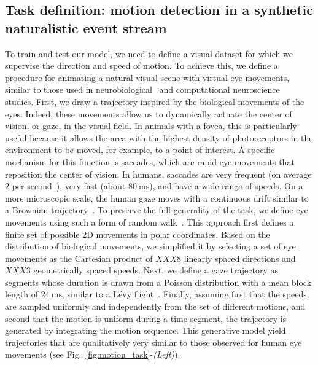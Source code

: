 \documentclass[default]{sn-jnl}%
\theoremstyle{thmstyleone}%
\theoremstyle{thmstyletwo}%
\theoremstyle{thmstylethree}%
\newcommand{\seeFig}[1]{see Fig.~\ref{fig:#1}}%
\newcommand{\ms}{\si{\milli\second}}%
\begin{document}
\subsection{Task definition: motion detection in a synthetic naturalistic event stream}\label{sec:task}
To train and test our model, we need to define a visual dataset for which we supervise the direction and speed of motion. To achieve this, we define a procedure for animating a natural visual scene with virtual eye movements, similar to those used in neurobiological~\citep{vinje_sparse_2000, baudot_animation_2013} and computational neuroscience~\citep{kremkow_push-pull_2016} studies. First, we draw a trajectory inspired by the biological movements of the eyes. Indeed, these movements allow us to dynamically actuate the center of vision, or gaze, in the visual field. In animals with a fovea, this is particularly useful because it allows the area with the highest density of photoreceptors in the environment to be moved, for example, to a point of interest. A specific mechanism for this function is saccades, which are rapid eye movements that reposition the center of vision. In humans, saccades are very frequent (on average $2$ per second~\citep{dandekar_neural_2012}), very fast (about $80~\ms$), and have a wide range of speeds. On a more microscopic scale, the human gaze moves with a continuous drift similar to a Brownian trajectory~\citep{poletti_head-eye_2015}. To preserve the full generality of the task, we define eye movements using such a form of random walk~\citep{engbert_integrated_2011}. This approach first defines a finite set of possible 2D movements in polar coordinates. Based on the distribution of biological movements, we simplified it by selecting a set of eye movements as the Cartesian product of $XXX8$ linearly spaced directions and $XXX3$ geometrically spaced speeds. Next, we define a gaze trajectory as segments whose duration is drawn from a Poisson distribution with a mean block length of $24~\ms$, similar to a Lévy flight~\citep[p. 289]{mandelbrot_fractal_1982}. Finally, assuming first that the speeds are sampled uniformly and independently from the set of different motions, and second that the motion is uniform during a time segment,  the trajectory is generated by integrating the motion sequence. This generative model yield trajectories that are qualitatively very similar to those observed for human eye movements (\seeFig{motion_task}-\textit{(Left)}).
\end{document}
